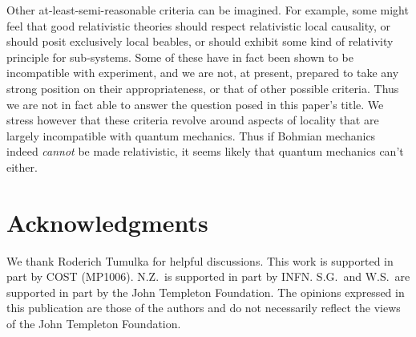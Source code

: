 \documentclass[12pt]{article}
\begin{document}
Other at-least-semi-reasonable criteria can be imagined.  For example,
some might feel that good relativistic theories should respect
relativistic local causality, or should posit exclusively local
beables, or should exhibit some kind of relativity principle for
sub-systems. Some of these have in fact been shown to be incompatible with experiment, and  we are not, at present, prepared to take any strong
position on their appropriateness, or that of other possible
criteria. Thus we are not in fact able to answer the question posed in this paper's title. We stress however that these criteria revolve around aspects of locality  that are largely  incompatible with quantum mechanics. Thus if Bohmian mechanics indeed \emph{cannot} be made relativistic, it seems likely that  quantum mechanics can't either. 


\section{Acknowledgments}
We thank Roderich Tumulka for helpful discussions. This work is supported in part by COST (MP1006). N.Z.~is supported in part by INFN. S.G.~and W.S.~are supported in part by the John Templeton Foundation. The opinions expressed in this publication are those of the authors and do not necessarily reflect the views of the John Templeton Foundation.
\end{document}
